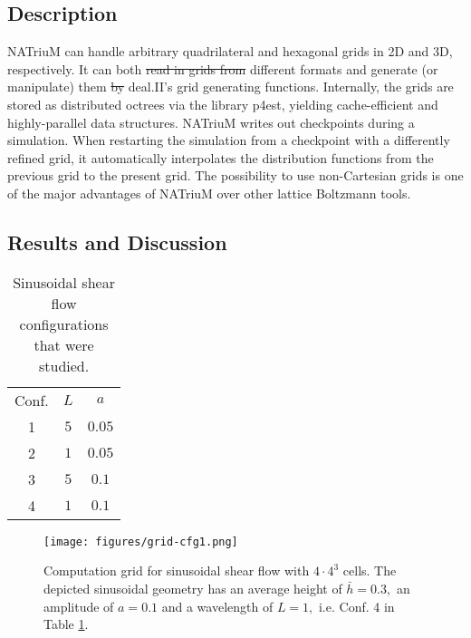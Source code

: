 \documentclass[1p, sort&compress]{elsarticle}
\providecommand{\DIFaddtex}[1]{{\protect\color{blue}\uwave{#1}}} %
\providecommand{\DIFdeltex}[1]{{\protect\color{red}\sout{#1}}}                      %
\providecommand{\DIFaddbegin}{} %
\providecommand{\DIFaddend}{} %
\providecommand{\DIFdelbegin}{} %
\providecommand{\DIFdelend}{} %
\providecommand{\DIFadd}[1]{\texorpdfstring{\DIFaddtex{#1}}{#1}} %
\providecommand{\DIFdel}[1]{\texorpdfstring{\DIFdeltex{#1}}{}} %
\newcommand{\DIFscaledelfig}{0.5}
\newlength{\DIFdelgraphicswidth} %
\newlength{\DIFdelgraphicsheight} %
\newcommand{\DIFaddincludegraphics}[2][]{{\color{blue}\fbox{\DIFOincludegraphics[#1]{#2}}}} %
\newcommand{\DIFdelincludegraphics}[2][]{%
\sbox{\DIFdelgraphicsbox}{\DIFOincludegraphics[#1]{#2}}%
\settoboxwidth{\DIFdelgraphicswidth}{\DIFdelgraphicsbox} %
\settoboxtotalheight{\DIFdelgraphicsheight}{\DIFdelgraphicsbox} %
\scalebox{\DIFscaledelfig}{%
\parbox[b]{\DIFdelgraphicswidth}{\usebox{\DIFdelgraphicsbox}\\[-\baselineskip] \rule{\DIFdelgraphicswidth}{0em}}\llap{\resizebox{\DIFdelgraphicswidth}{\DIFdelgraphicsheight}{%
\setlength{\unitlength}{\DIFdelgraphicswidth}%
\begin{picture}(1,1)%
\thicklines\linethickness{2pt} %
{\color[rgb]{1,0,0}\put(0,0){\framebox(1,1){}}}%
{\color[rgb]{1,0,0}\put(0,0){\line( 1,1){1}}}%
{\color[rgb]{1,0,0}\put(0,1){\line(1,-1){1}}}%
\end{picture}%
}\hspace*{3pt}}} %
} %
\DeclareRobustCommand{\DIFaddbegin}{\DIFOaddbegin \let\includegraphics\DIFaddincludegraphics} %
\DeclareRobustCommand{\DIFaddend}{\DIFOaddend \let\includegraphics\DIFOincludegraphics} %
\DeclareRobustCommand{\DIFdelbegin}{\DIFOdelbegin \let\includegraphics\DIFdelincludegraphics} %
\DeclareRobustCommand{\DIFdelend}{\DIFOaddend \let\includegraphics\DIFOincludegraphics} %
\begin{document}
\subsection{Description}
NATriuM can handle arbitrary quadrilateral and hexagonal grids in 2D and 3D, respectively. It can both \DIFdelbegin \DIFdel{read in grids from }\DIFdelend \DIFaddbegin \DIFadd{import grids of }\DIFaddend different formats and generate (or manipulate) them \DIFdelbegin \DIFdel{by }\DIFdelend \DIFaddbegin \DIFadd{using }\DIFaddend deal.II's grid generating functions. Internally, the grids are stored as distributed octrees via the library p4est, yielding cache-efficient and highly-parallel data structures. NATriuM writes out checkpoints during a simulation. When restarting the simulation from a checkpoint with a differently refined grid, it automatically interpolates the distribution functions from the previous grid to the present grid. The possibility to use non-Cartesian grids is one of the major advantages of NATriuM over other lattice Boltzmann tools.

\subsection{Results and Discussion}
\begin{table}
\centering
\caption{Sinusoidal shear flow configurations that were studied.\label{tab:sine_config}}
\begin{tabular}{c c c}
\hline 
\rule[-1ex]{0pt}{0.0ex} Conf. & $L$ & $a$ \\ 
\cmidrule{1-3}
\rule[-1ex]{0pt}{0.0ex} 1 & $5$ & $0.05$ \\ 
\rule[-1ex]{0pt}{0.0ex} 2 & $1$ & $0.05$ \\ 
\rule[-1ex]{0pt}{0.0ex} 3 & $5$ & $0.1$ \\ 
\rule[-1ex]{0pt}{0.0ex} 4 & $1$ & $0.1$ \\ 
\hline 
\end{tabular} 
\end{table}


\begin{figure}
	\centering
	\texttt{[image: figures/grid-cfg1.png]}
	\caption{ Computation grid for sinusoidal shear flow with $4 \cdot 4^3$ cells. The depicted sinusoidal geometry has an average height of $\bar{h} = 0.3,$ an amplitude of $a=0.1$ and a wavelength of $L=1,$ i.e. Conf. 4 in Table \ref{tab:sine_config}.
\label{fig:sine_grid}}
\end{figure}
\end{document}
